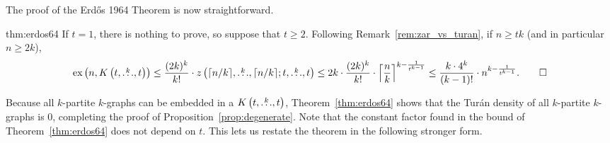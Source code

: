 The proof of the Erdős 1964 Theorem is now straightforward.

\begin{delayedproof}{thm:erdos64}
    If $t=1$, there is nothing to prove,
    so suppose that $t \geq 2$.
    Following Remark~\ref{rem:zar_vs_turan}, if $n \geq tk$
    (and in particular $n \geq 2k$),
    \[
        \text{ex} \left( n, K\left(t, \overset{k}{\dots}, t\right) \right)
        \leq \frac{(2k)^k}{k!} \cdot z\left(\lceil n / k \rceil, \overset{k}{\dots}, \lceil n / k \rceil; t, \overset{k}{\dots}, t\right)
        \leq 2k \cdot \frac{(2k)^k}{k!} \cdot \left\lceil \frac{n}{k} \right\rceil^{k - \frac{1}{t^{k-1}}}
        \leq \frac{k \cdot 4^k}{(k-1)!} \cdot n^{k - \frac{1}{t^{k-1}}}. \qedhere
    \]

\end{delayedproof}

Because all $k$-partite $k$-graphs can be embedded in a $K\left(t, \overset{k}{\dots}, t\right)$,
Theorem~\ref{thm:erdos64} shows that the Turán density of all $k$-partite $k$-graphs is $0$,
completing the proof of Proposition~\ref{prop:degenerate}.
Note that the constant factor found in the bound of Theorem~\ref{thm:erdos64}
does not depend on $t$.
This lets us restate the theorem in the following stronger form.


